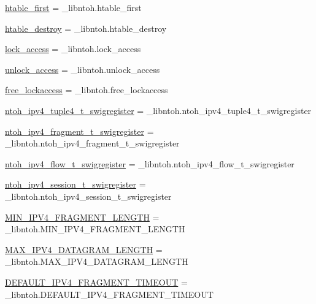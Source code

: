 \begin{DoxyCompactItemize}
\item 
\hyperlink{namespacelibntoh_aeb0dfe0d2ddb7cd05e595dc397d497f3}{htable\-\_\-first} = \-\_\-libntoh.\-htable\-\_\-first
\item 
\hyperlink{namespacelibntoh_acc2beae6ad7b2026497635dd611b630e}{htable\-\_\-destroy} = \-\_\-libntoh.\-htable\-\_\-destroy
\item 
\hyperlink{namespacelibntoh_acccc2cbe471e1aea8452b88becf23df4}{lock\-\_\-access} = \-\_\-libntoh.\-lock\-\_\-access
\item 
\hyperlink{namespacelibntoh_a723b3aed16ab52622f14ece2e3264924}{unlock\-\_\-access} = \-\_\-libntoh.\-unlock\-\_\-access
\item 
\hyperlink{namespacelibntoh_a0c662073624a7663c4ccfdc8842e8e26}{free\-\_\-lockaccess} = \-\_\-libntoh.\-free\-\_\-lockaccess
\item 
\hyperlink{namespacelibntoh_a4015863951076f7ec3c9e58245f6d5e4}{ntoh\-\_\-ipv4\-\_\-tuple4\-\_\-t\-\_\-swigregister} = \-\_\-libntoh.\-ntoh\-\_\-ipv4\-\_\-tuple4\-\_\-t\-\_\-swigregister
\item 
\hyperlink{namespacelibntoh_a618c1e32d36b56c0344acfcbe8607b7a}{ntoh\-\_\-ipv4\-\_\-fragment\-\_\-t\-\_\-swigregister} = \-\_\-libntoh.\-ntoh\-\_\-ipv4\-\_\-fragment\-\_\-t\-\_\-swigregister
\item 
\hyperlink{namespacelibntoh_a98c23f7ef411fee94d7bf8fd7e44fa5a}{ntoh\-\_\-ipv4\-\_\-flow\-\_\-t\-\_\-swigregister} = \-\_\-libntoh.\-ntoh\-\_\-ipv4\-\_\-flow\-\_\-t\-\_\-swigregister
\item 
\hyperlink{namespacelibntoh_a73ab615ccc7c2bffb516ef97477c5efa}{ntoh\-\_\-ipv4\-\_\-session\-\_\-t\-\_\-swigregister} = \-\_\-libntoh.\-ntoh\-\_\-ipv4\-\_\-session\-\_\-t\-\_\-swigregister
\item 
\hyperlink{namespacelibntoh_ae94f2cd1c533aeb9667a640e47fec53d}{M\-I\-N\-\_\-\-I\-P\-V4\-\_\-\-F\-R\-A\-G\-M\-E\-N\-T\-\_\-\-L\-E\-N\-G\-T\-H} = \-\_\-libntoh.\-M\-I\-N\-\_\-\-I\-P\-V4\-\_\-\-F\-R\-A\-G\-M\-E\-N\-T\-\_\-\-L\-E\-N\-G\-T\-H
\item 
\hyperlink{namespacelibntoh_a35b8888dbc65ac4b2037f649bbd726ef}{M\-A\-X\-\_\-\-I\-P\-V4\-\_\-\-D\-A\-T\-A\-G\-R\-A\-M\-\_\-\-L\-E\-N\-G\-T\-H} = \-\_\-libntoh.\-M\-A\-X\-\_\-\-I\-P\-V4\-\_\-\-D\-A\-T\-A\-G\-R\-A\-M\-\_\-\-L\-E\-N\-G\-T\-H
\item 
\hyperlink{namespacelibntoh_a731bbb8755dba80a3e78782d848615a2}{D\-E\-F\-A\-U\-L\-T\-\_\-\-I\-P\-V4\-\_\-\-F\-R\-A\-G\-M\-E\-N\-T\-\_\-\-T\-I\-M\-E\-O\-U\-T} = \-\_\-libntoh.\-D\-E\-F\-A\-U\-L\-T\-\_\-\-I\-P\-V4\-\_\-\-F\-R\-A\-G\-M\-E\-N\-T\-\_\-\-T\-I\-M\-E\-O\-U\-T

\end{DoxyCompactItemize}

